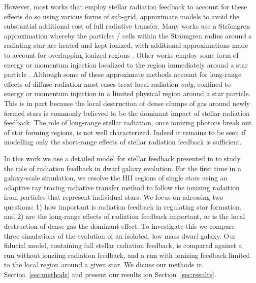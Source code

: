 \documentclass[twocolumn]{aastex62}
\begin{document}
{However, most works that employ stellar radiation feedback to account for these effects do so using various forms of sub-grid, approximate models to avoid the substantial additional cost of full radiative transfer. Many works use a Str{\"o}mgren approximation whereby the particles / cells within the Str{\"o}mgren radius around a radiating star are heated and kept ionized, with additional approximations made to account for overlapping ionized regions \citep[e.g.][]{HQM2011,Hu2016,Hu2017}. Other works employ some form of energy or momentum injection localized to the region immediately around a star particle \citep[e.g.][(\textit{need more})]{Agertz2013,Roskar2014,Ceverino2014,Forbes2016}. Although some of these approximate methods account for long-range effects of diffuse radiation \citep{HQM2012,Hopkins2018} most cases treat local radiation {\it only}, confined to energy or momentum injection in a limited physical region around a star particle. This is in part because the local destruction of dense clumps of gas around newly formed stars is commonly believed to be the dominant impact of stellar radiation feedback. The role of long-range stellar radiation, once ionizing photons break out of star forming regions, is not well characterized. Indeed it remains to be seen if modelling only the short-range effects of stellar radiation feedback is sufficient.


In this work we use a detailed model for stellar feedback presented in \citep{Emerick2018} to study the role of radiation feedback in dwarf galaxy evolution. For the first time in a galaxy-scale simulation, we resolve the HII regions of single stars using an adaptive ray tracing radiative transfer method to follow the ionizing radaition from particles that represent individual stars. We focus on adressing two questions: 1) how important is radiation feedback in regulating star formation, and 2) are the long-range effects of radiation feedback important, or is the local destruction of dense gas the dominant effect. To investigate this we compare three simulations of the evolution of an isolated, low mass dwarf galaxy. Our fiducial model, containing full stellar radiation feedback, is compared against a run without ionziing radiation feedback, and a run with ionizing feedback limited to the local region around a given star. We dicuss our methods in Section~\ref{sec:methods} and present our results ion Section~\ref{sec:results}.

}
\end{document}

